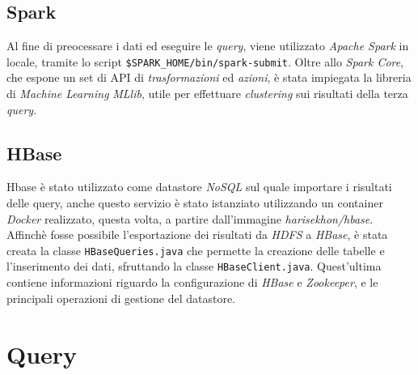 \documentclass[conference]{IEEEtran}
\begin{document}
\subsection*{\textbf{Spark}}
Al fine di preocessare i dati ed eseguire le \emph{query}, viene utilizzato \emph{Apache Spark} in locale, tramite lo script \texttt{\$SPARK\_HOME/bin/spark-submit}. Oltre allo \emph{Spark Core}, che espone un set di API di \emph{trasformazioni} ed \emph{azioni}, \`{e} stata impiegata la libreria di \emph{Machine Learning} \emph{MLlib}, utile per effettuare \emph{clustering} sui risultati della terza \emph{query}. 

\subsection*{\textbf{HBase}}
Hbase \`{e} stato utilizzato come datastore \emph{NoSQL} sul quale
importare i risultati delle ​query,​ anche questo servizio \`{e}
stato istanziato utilizzando un ​container \emph{Docker} realizzato,
questa volta, a partire dall'immagine​ \emph{harisekhon/hbase}​. Affinch\`{e} fosse possibile
l'esportazione dei risultati da \emph{HDFS} a \emph{HBase}, \`{e} stata creata la classe \texttt{HBaseQueries.java} che permette la creazione delle tabelle e l'inserimento dei dati, sfruttando la classe \texttt{HBaseClient.java}. Quest'ultima contiene informazioni riguardo la configurazione di \emph{HBase} e \emph{Zookeeper}, e le principali operazioni di gestione del datastore.\\
\section{\textbf{Query}}
\end{document}
